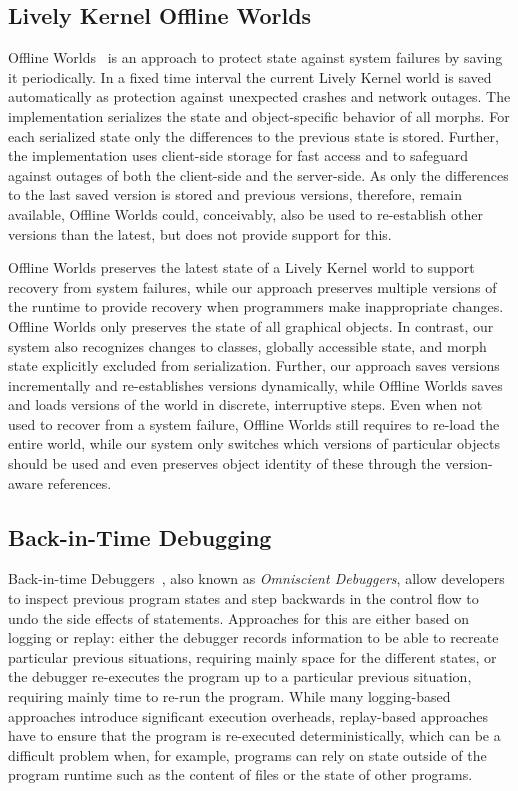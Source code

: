 \subsection{Lively Kernel Offline Worlds}

Offline Worlds~\cite{Czuchra2012OfW} is an approach to protect state against system failures by saving it periodically.
In a fixed time interval the current Lively Kernel world is saved automatically as protection against unexpected crashes and network outages.
The implementation serializes the state and object-specific behavior of all morphs.
For each serialized state only the differences to the previous state is stored.
Further, the implementation uses client-side storage for fast access and to safeguard against outages of both the client-side and the server-side.
As only the differences to the last saved version is stored and previous versions, therefore, remain available, Offline Worlds could, conceivably, also be used to re-establish other versions than the latest, but does not provide support for this.

Offline Worlds preserves the latest state of a Lively Kernel world to support recovery from system failures, while our approach preserves multiple versions of the runtime to provide recovery when programmers make inappropriate changes.
Offline Worlds only preserves the state of all graphical objects.
In contrast, our system also recognizes changes to classes, globally accessible state, and morph state explicitly excluded from serialization.
Further, our approach saves versions incrementally and re-establishes versions dynamically, while Offline Worlds saves and loads versions of the world in discrete, interruptive steps.
Even when not used to recover from a system failure, Offline Worlds still requires to re-load the entire world, while our system only switches which versions of particular objects should be used and even preserves object identity of these through the version-aware references.


\subsection{Back-in-Time Debugging}

Back-in-time Debuggers~\cite{Lewis2003BIT}, also known as \emph{Omniscient Debuggers}, allow developers to inspect previous program states and step backwards in the control flow to undo the side effects of statements.
Approaches for this are either based on logging or replay: either the debugger records information to be able to recreate particular previous situations, requiring mainly space for the different states, or the debugger re-executes the program up to a particular previous situation, requiring mainly time to re-run the program.
While many logging-based approaches introduce significant execution overheads, replay-based approaches have to ensure that the program is re-executed deterministically, which can be a difficult problem when, for example, programs can rely on state outside of the program runtime such as the content of files or the state of other programs.

